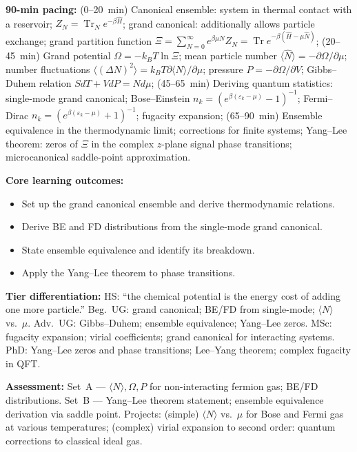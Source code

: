 \documentclass[11pt,a4paper]{article}
\begin{document}
\begin{tcolorbox}[modulebox, title={Module~II.7 --- Lecture L02: Canonical and Grand-Canonical Ensembles}]
\textbf{90-min pacing:} (0--20~min) Canonical ensemble: system in thermal contact with a reservoir; $Z_N=\operatorname{Tr}_Ne^{-\beta\hat{H}}$; grand canonical: additionally allows particle exchange; grand partition function $\Xi=\sum_{N=0}^\infty e^{\beta\mu N}Z_N=\operatorname{Tr}e^{-\beta(\hat{H}-\mu\hat{N})}$; (20--45~min) Grand potential $\Omega=-k_BT\ln\Xi$; mean particle number $\langle\hat{N}\rangle=-\partial\Omega/\partial\mu$; number fluctuations $\langle(\Delta N)^2\rangle=k_BT\partial\langle N\rangle/\partial\mu$; pressure $P=-\partial\Omega/\partial V$; Gibbs--Duhem relation $SdT+Vd P=Nd\mu$; (45--65~min) Deriving quantum statistics: single-mode grand canonical; Bose--Einstein $n_k=(e^{\beta(\varepsilon_k-\mu)}-1)^{-1}$; Fermi--Dirac $n_k=(e^{\beta(\varepsilon_k-\mu)}+1)^{-1}$; fugacity expansion; (65--90~min) Ensemble equivalence in the thermodynamic limit; corrections for finite systems; Yang--Lee theorem: zeros of $\Xi$ in the complex $z$-plane signal phase transitions; microcanonical saddle-point approximation.

\medskip\textbf{Core learning outcomes:}
\begin{itemize}[leftmargin=1.4em,topsep=2pt,itemsep=1pt]
  \item Set up the grand canonical ensemble and derive thermodynamic relations.
  \item Derive BE and FD distributions from the single-mode grand canonical.
  \item State ensemble equivalence and identify its breakdown.
  \item Apply the Yang--Lee theorem to phase transitions.
\end{itemize}

\medskip\textbf{Tier differentiation:}
HS: ``the chemical potential is the energy cost of adding one more particle.''
Beg.\ UG: grand canonical; BE/FD from single-mode; $\langle N\rangle$ vs.\ $\mu$.
Adv.\ UG: Gibbs--Duhem; ensemble equivalence; Yang--Lee zeros.
MSc: fugacity expansion; virial coefficients; grand canonical for interacting systems.
PhD: Yang--Lee zeros and phase transitions; Lee--Yang theorem; complex fugacity in QFT.

\medskip\textbf{Assessment:}
Set~A --- $\langle N\rangle,\Omega,P$ for non-interacting fermion gas; BE/FD distributions.
Set~B --- Yang--Lee theorem statement; ensemble equivalence derivation via saddle point.
Projects: (simple) $\langle N\rangle$ vs.\ $\mu$ for Bose and Fermi gas at various temperatures;
(complex) virial expansion to second order: quantum corrections to classical ideal gas.
\end{tcolorbox}
\end{document}
